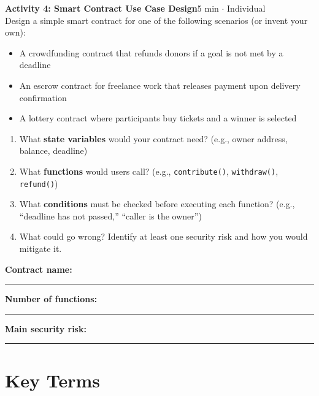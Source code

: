 \documentclass[11pt,a4paper]{article}
\newcommand{\activitybox}[3]{%
  \noindent\colorbox{mllavender4}{\parbox{\dimexpr\linewidth-2\fboxsep}{%
    \textbf{\color{mlpurple}#1}\hfill\textcolor{mlgray}{\small #2}\\[2pt]#3%
  }}\par\vspace{4pt}%
}
\newcommand{\fillcell}{\rule{2.2cm}{0.3pt}}
\begin{document}
\activitybox{Activity 4: Smart Contract Use Case Design}{5 min $\cdot$ Individual}{%
Design a simple smart contract for one of the following scenarios (or invent your own):
\begin{itemize}
\item A crowdfunding contract that refunds donors if a goal is not met by a deadline
\item An escrow contract for freelance work that releases payment upon delivery confirmation
\item A lottery contract where participants buy tickets and a winner is selected
\end{itemize}
\begin{enumerate}
\item What \textbf{state variables} would your contract need? (e.g., owner address, balance, deadline)
\item What \textbf{functions} would users call? (e.g., \texttt{contribute()}, \texttt{withdraw()}, \texttt{refund()})
\item What \textbf{conditions} must be checked before executing each function? (e.g., ``deadline has not passed,'' ``caller is the owner'')
\item What could go wrong? Identify at least one security risk and how you would mitigate it.
\end{enumerate}
\vspace{4pt}
\noindent
\textbf{Contract name:}~\fillcell\quad
\textbf{Number of functions:}~\fillcell\quad
\textbf{Main security risk:}~\fillcell
\vspace{2pt}
}

\vspace{4pt}

\section{Key Terms}
\end{document}
